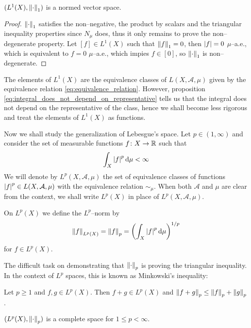 \begin{theorem}
	$(L^1(X), \norm{\cdot}_1)$ is a normed vector space.
\end{theorem}
\begin{proof}
	$\norm{\cdot}_1$ satisfies the non--negative, the product by scalars and the
	triangular inequality properties since $N_\mu$ does, thus it only remains to
	prove the non--degenerate property. Let $[f] \in L^1(X)$ such that
	$\norm{f}_1 = 0$, then $\abs{f} = 0$ $\mu$--a.e., which is equivalent to $f = 0$
	$\mu$--a.e., which impies $f \in [0]$, so $\norm{\cdot}_1$ is non--degenerate.
\end{proof}

The elements of $L^1(X)$ are the equivalence classes of $L(X, \mathcal{A}, \mu)$
given by the equivalence relation \eqref{eq:equivalence_relation}. However,
proposition \ref{eq:integral_does_not_depend_on_representative} tells us that
the integral does not depend on the representative of the class, hence we shall
become less rigorous and treat the elements of  $L^1(X)$ as functions.

Now we shall study the generalization of Lebesgue's space. Let $p \in (1,\infty)$
and consider the set of measurable functions $f \colon X \rightarrow \mathbb{R}$ such that
\[
	\int_X \abs{f}^p \dd{\mu} < \infty	
\]
We will denote by $L^p(X, \mathcal{A}, \mu)$ the set of equivalence classes of
functions $\abs{f}^p \in L(X, \mathcal{A}, \mu)$ with the equivalence relation
$\sim_\mu$. When both $\mathcal{A}$ and $\mu$ are clear from the context, we
shall write $L^p(X)$ in place of $L^p(X, \mathcal{A}, \mu)$.

\begin{definition*}
	On $L^p(X)$ we define the $L^p$--norm by
	\[
		\norm{f}_{L^p(X)} = \norm{f}_p = \left( \int_X \abs{f}^p \dd{\mu} \right)^{1/p}	
	\]
	for $f \in L^p(X)$.
\end{definition*}

The difficult task on demonstrating that $\norm{\cdot}_p$ is proving the
triangular inequality. In the context of $L^p$ spaces, this is known as Minkowski's inequality:

\begin{theorem} \label{teo:minkowski}
	Let $p \geq 1$ and $f, g \in L^p(X)$. Then $f + g \in L^p(X)$ and $\norm{f +
	g}_p \leq \norm{f}_p + \norm{g}_p$.
\end{theorem}

\begin{theorem} \label{teo:riesz_fischer}
	$(L^p(X), \norm{\cdot}_p)$ is a complete space for $1 \leq p < \infty$.
\end{theorem}

